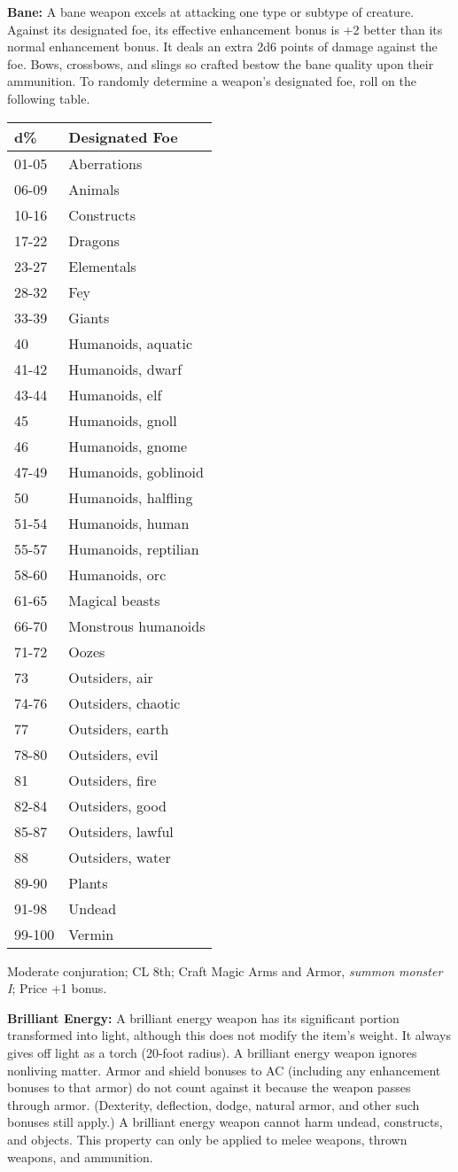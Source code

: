 \documentclass{article}
\begin{document}
\textbf{Bane:} A bane weapon excels at attacking one type or subtype of creature. 
Against its designated foe, its effective enhancement bonus is +2 better than its 
normal enhancement bonus. It deals an extra 2d6 points of damage against the foe. 
Bows, crossbows, and slings so crafted bestow the bane quality upon their ammunition. 
To randomly determine a weapon's designated foe, roll on the following table.

\begin{tabular}{|>{\raggedright}p{33pt}|>{\raggedright}p{93pt}|}
\hline
d\textbf{\%} & D\textbf{esignated Foe}\tabularnewline
\hline
01-05 & Aberrations\tabularnewline
\hline
06-09 & Animals\tabularnewline
\hline
10-16 & Constructs\tabularnewline
\hline
17-22 & Dragons\tabularnewline
\hline
23-27 & Elementals\tabularnewline
\hline
28-32 & Fey\tabularnewline
\hline
33-39 & Giants\tabularnewline
\hline
40 & Humanoids, aquatic\tabularnewline
\hline
41-42 & Humanoids, dwarf\tabularnewline
\hline
43-44 & Humanoids, elf\tabularnewline
\hline
45 & Humanoids, gnoll\tabularnewline
\hline
46 & Humanoids, gnome\tabularnewline
\hline
47-49 & Humanoids, goblinoid\tabularnewline
\hline
50 & Humanoids, halfling\tabularnewline
\hline
51-54 & Humanoids, human\tabularnewline
\hline
55-57 & Humanoids, reptilian\tabularnewline
\hline
58-60 & Humanoids, orc\tabularnewline
\hline
61-65 & Magical beasts\tabularnewline
\hline
66-70 & Monstrous humanoids\tabularnewline
\hline
71-72 & Oozes\tabularnewline
\hline
73 & Outsiders, air\tabularnewline
\hline
74-76 & Outsiders, chaotic\tabularnewline
\hline
77 & Outsiders, earth\tabularnewline
\hline
78-80 & Outsiders, evil\tabularnewline
\hline
81 & Outsiders, fire\tabularnewline
\hline
82-84 & Outsiders, good\tabularnewline
\hline
85-87 & Outsiders, lawful\tabularnewline
\hline
88 & Outsiders, water\tabularnewline
\hline
89-90 & Plants\tabularnewline
\hline
91-98 & Undead\tabularnewline
\hline
99-100 & Vermin\tabularnewline
\hline
\end{tabular}

Moderate conjuration; CL 8th; Craft Magic Arms and Armor, \textit{summon monster 
I}; Price +1 bonus.

\textbf{Brilliant Energy: }A brilliant energy weapon has its significant portion 
transformed into light, although this does not modify the item's weight. It always 
gives off light as a torch (20-foot radius). A brilliant energy weapon ignores 
nonliving matter. Armor and shield bonuses to AC (including any enhancement bonuses 
to that armor) do not count against it because the weapon passes through armor. 
(Dexterity, deflection, dodge, natural armor, and other such bonuses still apply.) 
A brilliant energy weapon cannot harm undead, constructs, and objects. This property 
can only be applied to melee weapons, thrown weapons, and ammunition.
\end{document}
